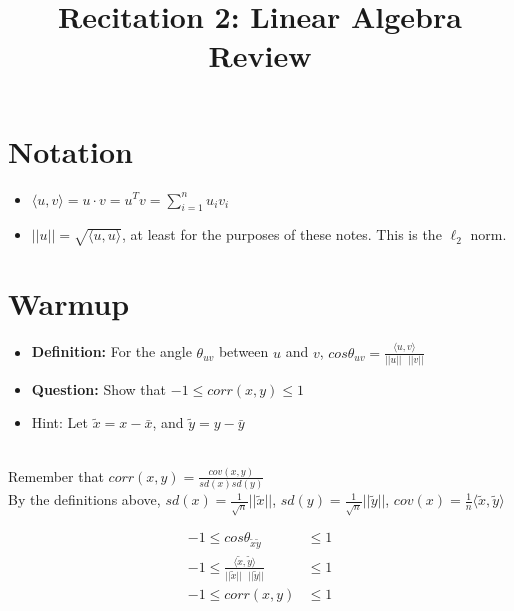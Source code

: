 \documentclass[12pt]{article}
\title{Recitation 2: Linear Algebra Review}
\date{}
\author{}
\begin{document}
\maketitle

\section{Notation}
\begin{itemize}
	\item $\langle u,v \rangle = u \cdot v = u^T v = \sum_{i = 1}^{n} u_i v_i$
	\item $||u|| = \sqrt{\langle u,u \rangle}$, at least for the purposes of these notes. This is the $\ell_2$ norm.
\end{itemize}

\section{Warmup}
\begin{itemize}
	\item \textbf{Definition:} For the angle $\theta_{uv}$ between $u$ and $v$, $cos \theta_{uv} = \frac{\langle u,v \rangle}{||u|| \text{ } ||v||}$
	\item \textbf{Question:} Show that $-1 \leq corr(x,y) \leq 1$
	\item Hint: Let $\tilde{x} = x - \bar{x}$, and $\tilde{y} = y - \bar{y}$ \\ \\
\end{itemize}

\vspace{15pt}
Remember that $corr(x,y) = \frac{cov(x,y)}{sd(x)sd(y)}$ \\

By the definitions above, $sd(x) = \frac{1}{\sqrt{n}}||\tilde{x}||$, $sd(y) = \frac{1}{\sqrt{n}}||\tilde{y}||$, $cov(x) = \frac{1}{n}\langle \tilde{x},\tilde{y} \rangle$

\begin{align*}
	-1 \leq cos \theta_{\tilde{x} \tilde{y}} &\leq 1 \\
	-1 \leq \frac{\langle \tilde{x}, \tilde{y} \rangle}{||\tilde{x}|| \text{ } ||\tilde{y}||} &\leq 1 \\
	-1 \leq corr (x,y) &\leq 1 \\
\end{align*}

\newpage
\end{document}
